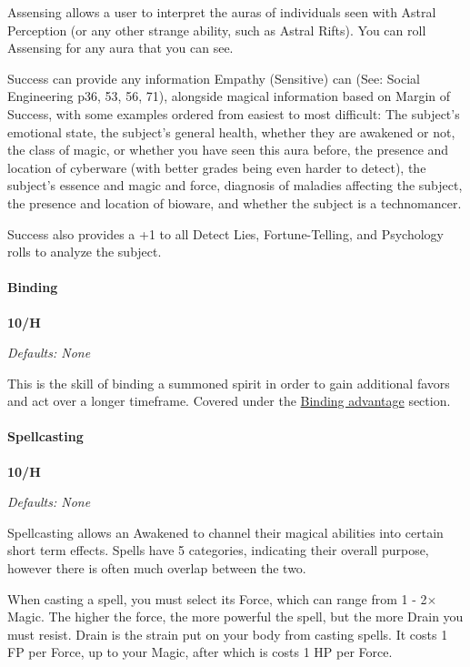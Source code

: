 \begin{multicols}{3}
	Assensing allows a user to interpret the auras of individuals seen with Astral Perception (or any other strange ability, such as Astral Rifts). You can roll Assensing for any aura that you can see.
	
	Success can provide any information Empathy (Sensitive) can (See: Social Engineering p36, 53, 56, 71), alongside magical information based on Margin of Success, with some examples ordered from easiest to most difficult: The subject's emotional state, the subject's general health, whether they are awakened or not, the class of magic, or whether you have seen this aura before, the presence and location of cyberware (with better grades being even harder to detect), the subject's essence and magic and force, diagnosis of maladies affecting the subject, the presence and location of bioware, and whether the subject is a technomancer. 
	
	Success also provides a +1 to all Detect Lies, Fortune-Telling, and Psychology rolls to analyze the subject.
	
	\paragraph{Binding}
	\begin{flushright}
		\textbf{10/H}
	\end{flushright}
	\textcolor{NavyBlue}{\textit{Defaults: None}}
	
	This is the skill of binding a summoned spirit in order to gain additional favors and act over a longer timeframe. Covered under the \hyperref[binding]{Binding advantage} section.
	
	\paragraph{Spellcasting}\label{spellcasting_skill}
	\begin{flushright}
		\textbf{10/H}
	\end{flushright}
	\textcolor{NavyBlue}{\textit{Defaults: None}}
	
	Spellcasting allows an Awakened to channel their magical abilities into certain short term effects. Spells have 5 categories, indicating their overall purpose, however there is often much overlap between the two.
	
	When casting a spell, you must select its Force, which can range from 1 - 2\(\times\)Magic. The higher the force, the more powerful the spell, but the more Drain you must resist. Drain is the strain put on your body from casting spells. It costs 1 FP per Force, up to your Magic, after which is costs 1 HP per Force. 
	

\end{multicols}
